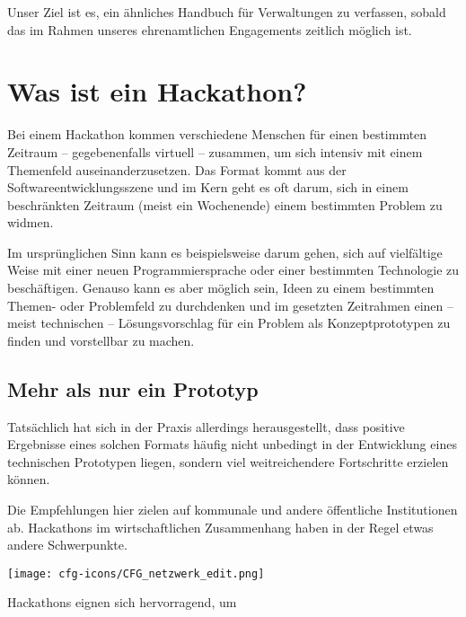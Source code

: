 Unser Ziel ist es, ein ähnliches Handbuch für Verwaltungen zu verfassen, sobald das im Rahmen unseres ehrenamtlichen Engagements zeitlich möglich ist.

\newpage

\chapter{Was ist ein Hackathon?}

Bei einem Hackathon kommen verschiedene Menschen für einen bestimmten Zeitraum – gegebenenfalls virtuell – zusammen, um sich intensiv mit einem Themenfeld auseinanderzusetzen. Das Format kommt aus der Softwareentwicklungsszene und im Kern geht es oft darum, sich in einem beschränkten Zeitraum (meist ein Wochenende) einem bestimmten Problem zu widmen.

Im ursprünglichen Sinn kann es beispielsweise darum gehen, sich auf vielfältige Weise mit einer neuen Programmiersprache oder einer bestimmten Technologie zu beschäftigen. Genauso kann es aber möglich sein, Ideen zu einem bestimmten Themen- oder Problemfeld zu durchdenken und im gesetzten Zeitrahmen einen – meist technischen – Lösungsvorschlag für ein Problem als Konzeptprototypen zu finden und vorstellbar zu machen.


\section*{Mehr als nur ein Prototyp}

Tatsächlich hat sich in der Praxis allerdings herausgestellt, dass positive Ergebnisse eines solchen Formats häufig nicht unbedingt in der Entwicklung eines technischen Prototypen liegen, sondern viel weitreichendere Fortschritte erzielen können.

Die Empfehlungen hier zielen auf kommunale und andere öffentliche Institutionen ab. Hackathons im wirtschaftlichen Zusammenhang haben in der Regel etwas andere Schwerpunkte.

\begin{marginfigure}[-10.5cm]
	\texttt{[image: cfg-icons/CFG\_netzwerk\_edit.png]}
\end{marginfigure}

Hackathons eignen sich hervorragend, um

